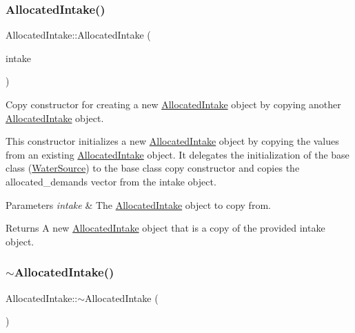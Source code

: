 \subsubsection{\texorpdfstring{Allocated\+Intake()}{AllocatedIntake()}\hspace{0.1cm}{\footnotesize\ttfamily [2/2]}}
{\footnotesize\ttfamily Allocated\+Intake\+::\+Allocated\+Intake (\begin{DoxyParamCaption}\item[{const \mbox{\hyperlink{classAllocatedIntake}{Allocated\+Intake}} \&}]{intake }\end{DoxyParamCaption})}



Copy constructor for creating a new {\ttfamily \mbox{\hyperlink{classAllocatedIntake}{Allocated\+Intake}}} object by copying another {\ttfamily \mbox{\hyperlink{classAllocatedIntake}{Allocated\+Intake}}} object. 

This constructor initializes a new {\ttfamily \mbox{\hyperlink{classAllocatedIntake}{Allocated\+Intake}}} object by copying the values from an existing {\ttfamily \mbox{\hyperlink{classAllocatedIntake}{Allocated\+Intake}}} object. It delegates the initialization of the base class ({\ttfamily \mbox{\hyperlink{classWaterSource}{Water\+Source}}}) to the base class copy constructor and copies the {\ttfamily allocated\+\_\+demands} vector from the intake object.


\begin{DoxyParams}{Parameters}
{\em intake} & The {\ttfamily \mbox{\hyperlink{classAllocatedIntake}{Allocated\+Intake}}} object to copy from.\\
\hline
\end{DoxyParams}
\begin{DoxyReturn}{Returns}
A new {\ttfamily \mbox{\hyperlink{classAllocatedIntake}{Allocated\+Intake}}} object that is a copy of the provided {\ttfamily intake} object. 
\end{DoxyReturn}
\mbox{\label{classAllocatedIntake_ada2f6552b83f4f11611bcd7bcb27fc37}} 
\subsubsection{\texorpdfstring{$\sim$\+Allocated\+Intake()}{~AllocatedIntake()}}
{\footnotesize\ttfamily Allocated\+Intake\+::$\sim$\+Allocated\+Intake (\begin{DoxyParamCaption}{ }\end{DoxyParamCaption})\hspace{0.3cm}{\ttfamily [override]}}



